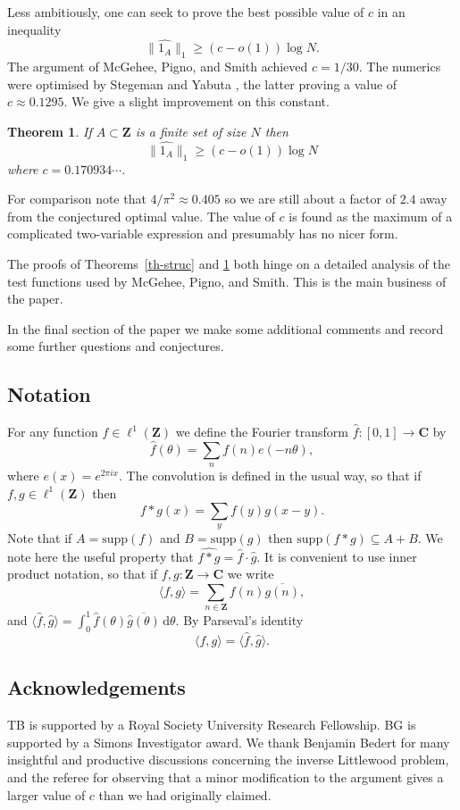 \documentclass[reqno]{amsart}
\newcommand{\anorm}[1]{\| \widehat{#1}\|}
\renewcommand{\geq}{\geqslant}
\newcommand{\bbz}{\mathbf{Z}}
\newcommand{\bbc}{\mathbf{C}}
\newcommand{\supp}{\mathrm{supp}}
\newcommand{\td}{\,\mathrm{d}}
\numberwithin{equation}{section}
\newtheorem{theorem}{Theorem}[section]
\theoremstyle{definition}
\theoremstyle{remark}
\begin{document}
Less ambitiously, one can seek to prove the best possible value of $c$ in an inequality
\[\anorm{1_A}_1\geq (c-o(1))\log N.\]
The argument of McGehee, Pigno, and Smith \cite{MPS81} achieved $c=1/30$. The numerics were optimised by Stegeman \cite{St82} and Yabuta \cite{Ya82}, the latter proving a value of $c \approx 0.1295$. We give a slight improvement on this constant.

\begin{theorem}\label{th-const}
If $A\subset \bbz$ is a finite set of size $N$ then
\[\anorm{1_A}_1 \geq (c-o(1))\log N\]
where $c= 0.170934\cdots$.
\end{theorem}
For comparison note that $4/\pi^2\approx 0.405$ so we are still about a factor of $2.4$ away from the conjectured optimal value. The value of $c$ is found as the maximum of a complicated two-variable expression and presumably has no nicer form.

The proofs of Theorems~\ref{th-struc} and \ref{th-const} both hinge on a detailed analysis of the test functions used by McGehee, Pigno, and Smith. This is the main business of the paper.

In the final section of the paper we make some additional comments and record some further questions and conjectures.

\subsection*{Notation} For any function $f\in \ell^1(\bbz)$ we define the Fourier transform $\widehat{f}:[0,1]\to \bbc$ by
\[\widehat{f}(\theta) = \sum_{n} f(n) e(-n\theta),\]
where $e(x) = e^{2\pi ix}$. The convolution is defined in the usual way, so that if $f,g\in \ell^1(\bbz)$ then 
\[f\ast g(x) = \sum_{y} f(y)g(x-y).\]
Note that if $A=\supp(f)$ and $B=\supp(g)$ then $\supp(f\ast g)\subseteq A+B$. We note here the useful property that $\widehat{f\ast g}=\widehat{f}\cdot \widehat{g}$. It is convenient to use inner product notation, so that if $f,g:\bbz\to\bbc$ we write 
\[\langle f,g\rangle = \sum_{n\in \bbz}f(n)\overline{g(n)},\]
and $\langle \widehat{f},\widehat{g}\rangle = \int_0^1 \widehat{f}(\theta)\overline{\widehat{g}(\theta)}\td \theta$. By Parseval's identity
\[\langle f,g\rangle = \langle \widehat{f},\widehat{g}\rangle.\]
\subsection*{Acknowledgements} TB is supported by a Royal Society University Research Fellowship. BG is supported by a Simons Investigator award. We thank Benjamin Bedert for many insightful and productive discussions concerning the inverse Littlewood problem, and the referee for observing that a minor modification to the argument gives a larger value of $c$ than we had originally claimed.
\end{document}

